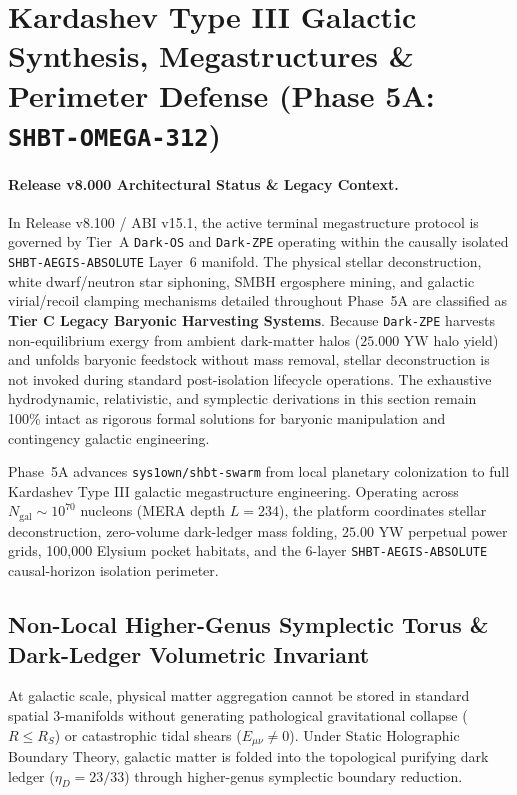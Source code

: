\documentclass[11pt,onecolumn]{article}
\begin{document}
\FloatBarrier


\section{Kardashev Type III Galactic Synthesis, Megastructures \& Perimeter Defense (Phase 5A: \texttt{SHBT-OMEGA-312})}
\paragraph{Release v8.000 Architectural Status \& Legacy Context.}
In Release v8.100 / ABI v15.1, the active terminal megastructure protocol is governed by Tier~A \texttt{Dark-OS} and \texttt{Dark-ZPE} operating within the causally isolated \texttt{SHBT-AEGIS-ABSOLUTE} Layer~6 manifold. The physical stellar deconstruction, white dwarf/neutron star siphoning, SMBH ergosphere mining, and galactic virial/recoil clamping mechanisms detailed throughout Phase~5A are classified as \textbf{Tier C Legacy Baryonic Harvesting Systems}. Because \texttt{Dark-ZPE} harvests non-equilibrium exergy from ambient dark-matter halos ($25.000\text{ YW}$ halo yield) and unfolds baryonic feedstock without mass removal, stellar deconstruction is not invoked during standard post-isolation lifecycle operations. The exhaustive hydrodynamic, relativistic, and symplectic derivations in this section remain 100\% intact as rigorous formal solutions for baryonic manipulation and contingency galactic engineering.

\label{sec:omega_megastructures}

Phase~5A advances \texttt{sys1own/shbt-swarm} from local planetary colonization to full Kardashev Type III galactic megastructure engineering. Operating across $N_{\text{gal}} \sim 10^{70}$ nucleons (MERA depth $L = 234$), the platform coordinates stellar deconstruction, zero-volume dark-ledger mass folding, $25.00\text{ YW}$ perpetual power grids, 100,000 Elysium pocket habitats, and the 6-layer \texttt{SHBT-AEGIS-ABSOLUTE} causal-horizon isolation perimeter.

\subsection{Non-Local Higher-Genus Symplectic Torus \& Dark-Ledger Volumetric Invariant}
\label{sec:omega_symplectic_torus}

At galactic scale, physical matter aggregation cannot be stored in standard spatial 3-manifolds without generating pathological gravitational collapse ($R \le R_S$) or catastrophic tidal shears ($E_{\mu\nu} \neq 0$). Under Static Holographic Boundary Theory, galactic matter is folded into the topological purifying dark ledger ($\eta_D = 23/33$) through higher-genus symplectic boundary reduction.
\end{document}
